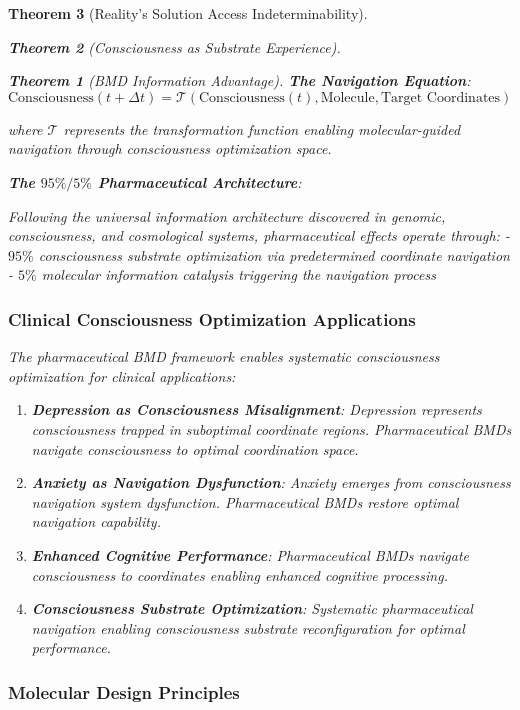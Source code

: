 \documentclass[12pt,a4paper]{article}
\newtheorem{theorem}{Theorem}[section]
\theoremstyle{remark}
\begin{document}
\begin{theorem}[Reality's Solution Access Indeterminability]
\begin{theorem}[Consciousness as Substrate Experience]
\begin{theorem}[BMD Information Advantage]
\textbf{The Navigation Equation}:
$$\text{Consciousness}(t + \Delta t) = \mathcal{T}(\text{Consciousness}(t), \text{Molecule}, \text{Target Coordinates})$$

where $\mathcal{T}$ represents the transformation function enabling molecular-guided navigation through consciousness optimization space.

\textbf{The $95\%/5\%$ Pharmaceutical Architecture}:

Following the universal information architecture discovered in genomic, consciousness, and cosmological systems, pharmaceutical effects operate through:
- $95\%$ consciousness substrate optimization via predetermined coordinate navigation
- $5\%$ molecular information catalysis triggering the navigation process

\subsubsection{Clinical Consciousness Optimization Applications}

The pharmaceutical BMD framework enables systematic consciousness optimization for clinical applications:

\begin{enumerate}
\item \textbf{Depression as Consciousness Misalignment}: Depression represents consciousness trapped in suboptimal coordinate regions. Pharmaceutical BMDs navigate consciousness to optimal coordination space.

\item \textbf{Anxiety as Navigation Dysfunction}: Anxiety emerges from consciousness navigation system dysfunction. Pharmaceutical BMDs restore optimal navigation capability.

\item \textbf{Enhanced Cognitive Performance}: Pharmaceutical BMDs navigate consciousness to coordinates enabling enhanced cognitive processing.

\item \textbf{Consciousness Substrate Optimization}: Systematic pharmaceutical navigation enabling consciousness substrate reconfiguration for optimal performance.
\end{enumerate}

\subsubsection{Molecular Design Principles}


\end{theorem}
\end{theorem}
\end{theorem}
\end{document}
